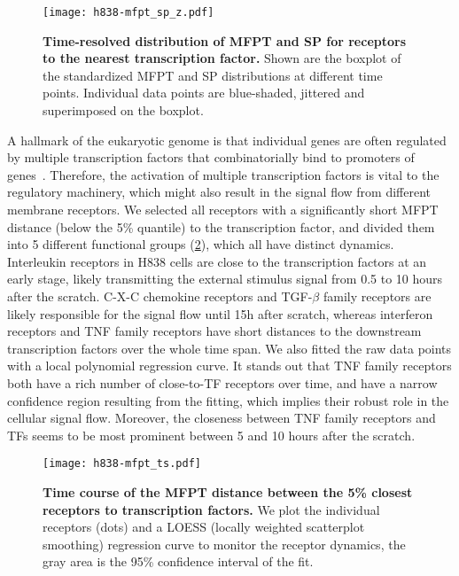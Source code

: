 \begin{figure}[!ht]
\begin{center}
\texttt{[image: h838-mfpt\_sp\_z.pdf]}
\end{center}
\caption[MFPT and SP distribution]{
{\bf Time-resolved distribution of MFPT and SP for receptors to the 
nearest transcription factor.} 
Shown are the boxplot of the standardized MFPT and SP distributions at 
different time points. Individual data points are blue-shaded, jittered
and superimposed on the boxplot.
}
\label{fig:h838_mfpt_sp}
\end{figure}

A hallmark of the eukaryotic genome is that individual genes are often 
regulated by multiple transcription factors that combinatorially bind to 
promoters of genes~\citep{Harbison2004}. Therefore, the activation of multiple transcription
factors is vital to the regulatory machinery, which might also result
in the signal flow from different membrane receptors.
We selected all receptors with a significantly short MFPT distance (below the 5\% 
quantile) to the transcription factor, and divided them into 5 different
functional groups (\ref{fig:h838_mfpt_ts}), which all have distinct
dynamics. Interleukin receptors in H838 cells are close to the transcription
factors at an early stage, likely 
transmitting the external stimulus signal from 0.5 to 10 hours after
the scratch. C-X-C chemokine receptors and TGF-$\beta$ family receptors
are likely responsible for the signal flow until 15h after scratch,
whereas interferon receptors and TNF family receptors have short distances
to the downstream transcription factors over the whole time span.
We also fitted the raw data points with a local polynomial regression
curve. It stands out that TNF family receptors both have a rich number
of close-to-TF receptors over time, and have a narrow confidence region
resulting from the fitting, which implies their robust role in the 
cellular signal flow. Moreover, the closeness between TNF family receptors
and TFs seems to be most prominent between 5 and 10 hours after the scratch.

\begin{figure}[!ht]
\begin{center}
\texttt{[image: h838-mfpt\_ts.pdf]}
\end{center}
\caption[Time course of the MFPT distance]{
{\bf Time course of the MFPT distance between the 5\% closest receptors
to transcription factors.} 
We plot the individual receptors (dots) and a LOESS (locally weighted 
scatterplot smoothing) regression curve to monitor the receptor dynamics,
the gray area is the 95\% confidence interval of the fit.
}
\label{fig:h838_mfpt_ts}
\end{figure}

